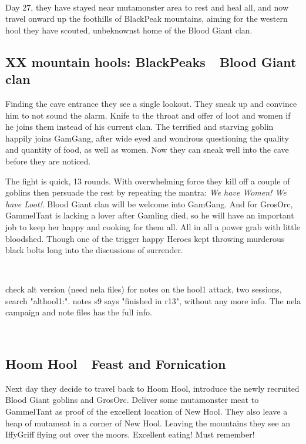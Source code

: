 \

Day 27, they have stayed near mutamonster area to rest and heal all, and now travel onward up the foothills of BlackPeak mountains, aiming for the western hool they have scouted, unbeknownst home of the Blood Giant clan.


\subsection*{XX mountain hools: BlackPeaks~\mdash~Blood Giant clan}

Finding the cave entrance they see a single lookout. They sneak up and convince him to not sound the alarm. Knife to the throat and offer of loot and women if he joins them instead of his current clan. The terrified and starving goblin happily joins GamGang, after wide eyed and wondrous questioning the quality and quantity of food, as well as women. Now they can sneak well into the cave before they are noticed.

The fight is quick, 13 rounds. With overwhelming force they kill off a couple of goblins then persuade the rest by repeating the mantra: \emph{We have Women! We have Loot!}. Blood Giant clan will be welcome into GamGang. And for GrosOrc, GammelTant is lacking a lover after Gamling died, so he will have an important job to keep her happy and cooking for them all. All in all a power grab with little bloodshed. Though one of the trigger happy Heroes kept throwing murderous black bolts long into the discussions of surrender.

\

\todo check alt version (need nela files) for notes on the hool1 attack, two sessions, search "althool1:". notes s9 says "finished in r13", without any more info. The nela campaign and note files has the full info.

\


\subsection*{Hoom Hool~\mdash~Feast and Fornication}

Next day they decide to travel back to Hoom Hool, introduce the newly recruited Blood Giant goblins and GrosOrc. Deliver some mutamonster meat to GammelTant as proof of the excellent location of New Hool. They also leave a heap of mutameat in a corner of New Hool. Leaving the mountains they see an IffyGriff flying out over the moors. Excellent eating! Must remember!


